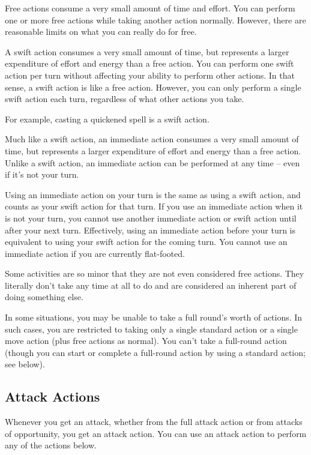  Free actions consume a very small amount of time and effort. You can perform one or more free actions while taking another action normally. However, there are reasonable limits on what you can really do for free.

 A swift action consumes a very small amount of time, but represents a larger expenditure of effort and energy than a free action. You can perform one swift action per turn without affecting your ability to perform other actions. In that sense, a swift action is like a free action. However, you can only perform a single swift action each turn, regardless of what other actions you take.

For example, casting a quickened spell is a swift action.

 Much like a swift action, an immediate action consumes a very small amount of time, but represents a larger expenditure of effort and energy than a free action. Unlike a swift action, an immediate action can be performed at any time -- even if it's not your turn.

Using an immediate action on your turn is the same as using a swift action, and counts as your swift action for that turn. If you use an immediate action when it is not your turn, you cannot use another immediate action or swift action until after your next turn. Effectively, using an immediate action before your turn is equivalent to using your swift action for the coming turn. You cannot use an immediate action if you are currently flat-footed.

 Some activities are so minor that they are not even considered free actions. They literally don't take any time at all to do and are considered an inherent part of doing something else.

 In some situations, you may be unable to take a full round's worth of actions. In such cases, you are restricted to taking only a single standard action or a single move action (plus free actions as normal). You can't take a full-round action (though you can start or complete a full-round action by using a standard action; see below).

\subsection{Attack Actions}
Whenever you get an attack, whether from the full attack action or from attacks of opportunity, you get an attack action. You can use an attack action to perform any of the actions below.

